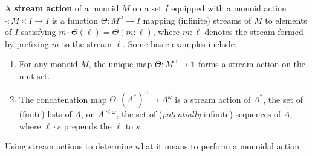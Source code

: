 \documentclass[acmsmall,screen,review]{acmart}
\newcommand{\mc}[1]{\ensuremath{\mathcal{#1}}}
\newcommand{\ms}[1]{\ensuremath{\mathsf{#1}}}
\newcommand{\nats}{\mathbb{N}}
\begin{document}
\begin{definition}
  A \textbf{stream action} of a monoid \(M\) on a set \(I\) equipped with a
  monoid action \(\cdot: M \times I \to I\) is a function \(\Theta: M^\omega \to
  I\) mapping (infinite) streams of \(M\) to elements of \(I\) satisfying
  \(
    m \cdot \Theta(\ell) = \Theta(m \colon \ell)
  \),
  where \(m \colon \ell\) denotes the stream formed by prefixing \(m\) to the
  stream \(\ell\).
  Some basic examples include:
  \begin{enumerate}
    \item For any monoid \(M\), the unique map \(\Theta: M^\omega \to \mathbf{1}\)
    forms a stream action on the unit set.
    \item The concatenation map \(\Theta: (A^*)^\omega \to A^\omega\) is a
    stream action of \(A^*\), the set of (finite) lists of \(A\), on \(A^{\leq
    \omega}\), the set of (\textit{potentially} infinite) sequences of \(A\),
    where \(\ell \cdot s\) prepends the \(\ell\) to \(s\).
  \end{enumerate}
\end{definition}
Using stream actions to determine what it means to perform a monoidal action
\end{document}
